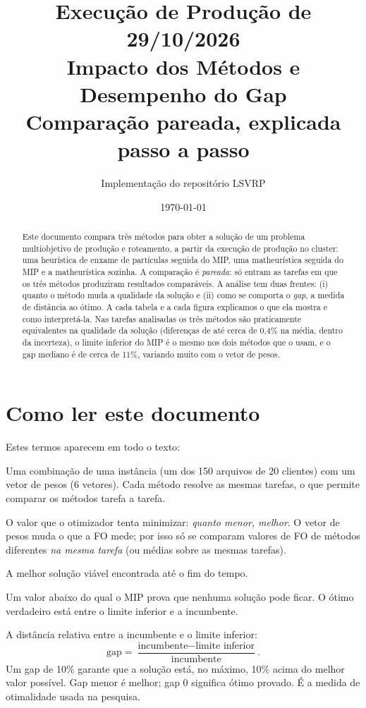 \documentclass[11pt,a4paper]{article}
\title{Execução de Produção de 29/10/2026\\
       Impacto dos Métodos e Desempenho do Gap\\
       \large Comparação pareada, explicada passo a passo}
\author{Implementação do repositório LSVRP}
\date{\today}
\begin{document}
\maketitle

\begin{abstract}
\sloppy
Este documento compara três métodos para obter a solução de um problema
multiobjetivo de produção e roteamento, a partir da execução de produção no
cluster: uma heurística de enxame de partículas seguida do MIP, uma
matheurística seguida do MIP e a matheurística sozinha. A comparação é
\emph{pareada}: só entram as \nPaired{} tarefas em que os três métodos
produziram resultados comparáveis. A análise tem duas frentes: (i) quanto o
método muda a qualidade da solução e (ii) como se comporta o \emph{gap}, a medida
de distância ao ótimo. A cada tabela e a cada figura explicamos o que ela mostra
e como interpretá-la. Nas tarefas analisadas os três métodos são praticamente
equivalentes na qualidade da solução (diferenças de até cerca de 0,4\% na média,
dentro da incerteza), o limite inferior do MIP é o mesmo nos dois métodos que o
usam, e o gap mediano é de cerca de 11\%, variando muito com o vetor de pesos.
\end{abstract}

\section*{Como ler este documento}

Estes termos aparecem em todo o texto:

\begin{description}[leftmargin=1.5em,style=nextline]
  \item[Tarefa] Uma combinação de uma instância (um dos 150 arquivos de 20
  clientes) com um vetor de pesos (6 vetores). Cada método resolve as mesmas
  tarefas, o que permite comparar os métodos tarefa a tarefa.
  \item[FO (função objetivo)] O valor que o otimizador tenta minimizar:
  \emph{quanto menor, melhor}. O vetor de pesos muda o que a FO mede; por isso
  só se comparam valores de FO de métodos diferentes \emph{na mesma tarefa} (ou
  médias sobre as mesmas tarefas).
  \item[Incumbente] A melhor solução viável encontrada até o fim do tempo.
  \item[Limite inferior] Um valor abaixo do qual o MIP prova que nenhuma solução
  pode ficar. O ótimo verdadeiro está entre o limite inferior e a incumbente.
  \item[Gap] A distância relativa entre a incumbente e o limite inferior:
  \[
    \text{gap} = \frac{\text{incumbente} - \text{limite inferior}}{\text{incumbente}}.
  \]
  Um gap de 10\% garante que a solução está, no máximo, 10\% acima do melhor
  valor possível. Gap menor é melhor; gap 0 significa ótimo provado. É a
  medida de otimalidade usada na pesquisa.
\end{description}
\end{document}
